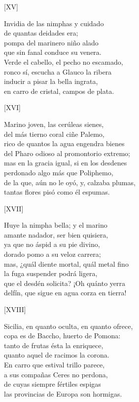 \documentclass[11pt,a4paper,twoside]{article}
\begin{document}
%
\begin{center}
	[XV]
\end{center}\pstart
Invidia de las nimphas y cuidado\\
de quantas  deidades era;\\
pompa del marinero niño alado\\
que sin fanal conduce su venera.\\
Verde el cabello, el pecho no escamado,\\
ronco sí, escucha a Glauco la ribera\\
inducir a pisar la bella ingrata,\\
en carro de cristal, campos de plata.\par\pend
\relax
\vfill
\newpage
%
\begin{center}
	[XVI]
\end{center}\pstart
Marino joven, las cerúleas sienes,\\
del más tierno coral ciñe Palemo,\\
rico de quantos la agua engendra bienes\\
del Pharo odioso al promontorio extremo;\\
mas en la gracia igual, si en los desdenes\\
perdonado algo más que Poliphemo,\\
de la que, aún no le oyó, y, calzaba plumas,\\
tantas flores pisó como él espumas.\par\pend
%
\begin{center}
	[XVII]
\end{center}\pstart
Huye la nimpha bella; y el marino\\
amante nadador, ser bien quisiera,\\
ya que no áspid a su pie divino,\\
dorado pomo a su veloz carrera;\\
mas, ¿quál diente mortal, quál metal fino\\
la fuga suspender podrá ligera,\\
que el desdén solicita? ¡Oh quánto yerra\\
delfín, que sigue en agua corza en tierra!\par\pend
%
\begin{center}
	[XVIII]
\end{center}\pstart
Sicilia, en quanto oculta, en quanto ofrece,\\
copa es de Baccho, huerto de Pomona:\\
tanto de frutas ésta la enriquece,\\
quanto aquel de racimos la corona.\\
En carro que estival trillo parece,\\
a sus compañas Ceres no perdona,\\
de cuyas siempre fértiles espigas\\
las provincias de Europa son hormigas.\par\pend
\end{document}
